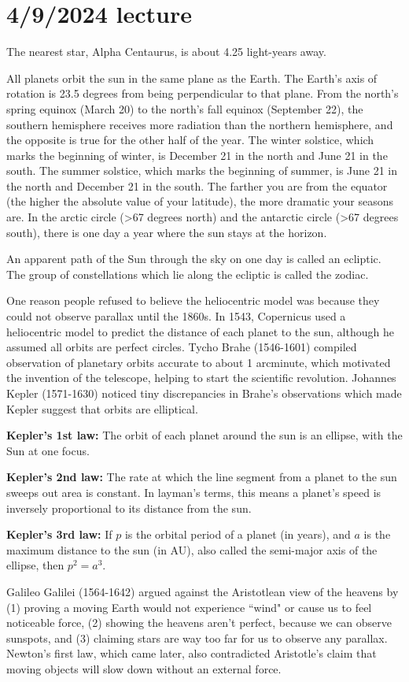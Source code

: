 \documentclass[class=article, crop=false]{standalone}
\begin{document}
\section{4/9/2024 lecture}
The nearest star, Alpha Centaurus, is about 4.25 light-years away.
\par
All planets orbit the sun in the same plane as the Earth. The Earth's axis of rotation is 23.5 degrees from being perpendicular to that plane. From the north's spring equinox (March 20) to the north's fall equinox (September 22), the southern hemisphere receives more radiation than the northern hemisphere, and the opposite is true for the other half of the year. The winter solstice, which marks the beginning of winter, is December 21 in the north and June 21 in the south. The summer solstice, which marks the beginning of summer, is June 21 in the north and December 21 in the south. The farther you are from the equator (the higher the absolute value of your latitude), the more dramatic your seasons are. In the arctic circle (>67 degrees north) and the antarctic circle (>67 degrees south), there is one day a year where the sun stays at the horizon.
\par
An apparent path of the Sun through the sky on one day is called an ecliptic. The group of constellations which lie along the ecliptic is called the zodiac.\par
One reason people refused to believe the heliocentric model was because they could not observe parallax until the 1860s. In 1543, Copernicus used a heliocentric model to predict the distance of each planet to the sun, although he assumed all orbits are perfect circles. Tycho Brahe (1546-1601) compiled observation of planetary orbits accurate to about 1 arcminute, which motivated the invention of the telescope, helping to start the scientific revolution. Johannes Kepler (1571-1630) noticed tiny discrepancies in Brahe's observations which made Kepler suggest that orbits are elliptical.
\par
\textbf{Kepler's 1st law:} The orbit of each planet around the sun is an ellipse, with the Sun at one focus.
\par
\textbf{Kepler's 2nd law:} The rate at which the line segment from a planet to the sun sweeps out area is constant. In layman's terms, this means a planet's speed is inversely proportional to its distance from the sun.
\par
\textbf{Kepler's 3rd law:} If $p$ is the orbital period of a planet (in years), and $a$ is the maximum distance to the sun (in AU), also called the semi-major axis of the ellipse, then $p^2=a^3$.
\par
Galileo Galilei (1564-1642) argued against the Aristotlean view of the heavens by (1) proving a moving Earth would not experience ``wind" or cause us to feel noticeable force, (2) showing the heavens aren't perfect, because we can observe sunspots, and (3) claiming stars are way too far for us to observe any parallax. Newton's first law, which came later, also contradicted Aristotle's claim that moving objects will slow down without an external force.
\end{document}

